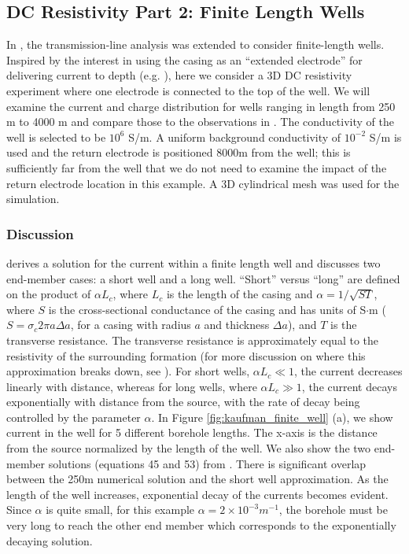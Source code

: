 \documentclass[preprint,review,3p,times,onecolumn,authoryear]{elsarticle}
\begin{document}
\subsection{DC Resistivity Part 2: Finite Length Wells}
\label{sec:dc_resistivity_part2}

In \citep{Kaufman1993}, the transmission-line analysis was extended to consider finite-length wells. Inspired by the interest in using the casing as an ``extended electrode'' for delivering current to depth (e.g. \cite{Schenkel1994, Um2015, Weiss2016, hoversten2017borehole}), here we consider a 3D DC resistivity experiment where one electrode is connected to the top of the well. We will examine the current and charge distribution for wells ranging in length from 250 m to 4000 m and compare those to the observations in \citep{Kaufman1993}. The conductivity of the well is selected to be $10^6$ S/m. A uniform background conductivity of $10^{-2}$ S/m is used and the return electrode is positioned 8000m from the well; this is sufficiently far from the well that we do not need to examine the impact of the return electrode location in this example. A 3D cylindrical mesh was used for the simulation.

\subsubsection{Discussion}

\cite{Kaufman1993} derives a solution for the current within a finite length well and discusses two end-member cases: a short well and a long well. ``Short'' versus ``long'' are defined on the product of $\alpha L_c$, where $L_c$ is the length of the casing and $\alpha = 1/\sqrt{S T}$, where $S$ is the cross-sectional conductance of the casing and has units of S$\cdot$m ($S = \sigma_c 2\pi a \Delta a$, for a casing with radius $a$ and thickness $\Delta a$), and $T$ is the transverse resistance. The transverse resistance  is approximately equal to the resistivity of the surrounding formation (for more discussion on where this approximation breaks down, see \cite{Schenkel1994}). For short wells, $\alpha L_c \ll 1$, the current decreases linearly with distance, whereas for long wells, where $\alpha L_c \gg 1$, the current decays exponentially with distance from the source, with the rate of decay being controlled by the parameter $\alpha$. In Figure \ref{fig:kaufman_finite_well} (a), we show current in the well for 5 different borehole lengths. The x-axis is the distance from the source normalized by the length of the well. We also show the two end-member solutions (equations 45 and 53) from \cite{Kaufman1993}. There is significant overlap between the 250m numerical solution and the short well approximation. As the length of the well increases, exponential decay of the currents becomes evident. Since $\alpha$ is quite small, for this example $\alpha = 2 \times 10^{-3} m^{-1}$, the borehole must be very long to reach the other end member which corresponds to the exponentially decaying solution.
\end{document}
